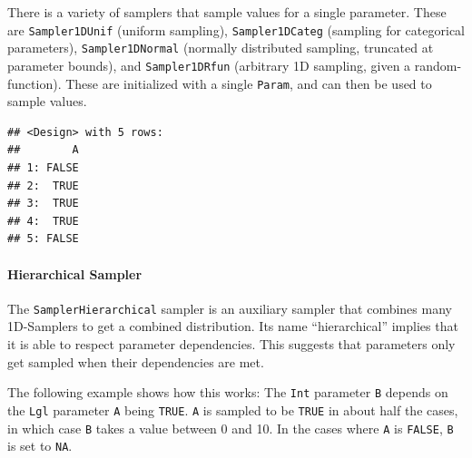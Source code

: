 \documentclass[]{scrbook}
\newenvironment{Shaded}{\begin{snugshade}}{\end{snugshade}}
\newcommand{\DecValTok}[1]{\textcolor[rgb]{0.00,0.00,0.81}{#1}}
\newcommand{\KeywordTok}[1]{\textcolor[rgb]{0.13,0.29,0.53}{\textbf{#1}}}
\newcommand{\NormalTok}[1]{#1}
\newcommand{\OperatorTok}[1]{\textcolor[rgb]{0.81,0.36,0.00}{\textbf{#1}}}
\newcommand{\StringTok}[1]{\textcolor[rgb]{0.31,0.60,0.02}{#1}}
\let\oldparagraph\paragraph
\renewcommand{\paragraph}[1]{\oldparagraph{#1}\mbox{}}
\renewenvironment{Shaded} {\begin{snugshade}\small} {\end{snugshade}}
\begin{document}
There is a variety of samplers that sample values for a single parameter.
These are \texttt{Sampler1DUnif} (uniform sampling), \texttt{Sampler1DCateg} (sampling for categorical parameters), \texttt{Sampler1DNormal} (normally distributed sampling, truncated at parameter bounds), and \texttt{Sampler1DRfun} (arbitrary 1D sampling, given a random-function).
These are initialized with a single \texttt{Param}, and can then be used to sample values.

\begin{Shaded}
\end{Shaded}

\begin{verbatim}
## <Design> with 5 rows:
##        A
## 1: FALSE
## 2:  TRUE
## 3:  TRUE
## 4:  TRUE
## 5: FALSE
\end{verbatim}

\hypertarget{hierarchical-sampler}{%
\paragraph{Hierarchical Sampler}\label{hierarchical-sampler}}

The \texttt{SamplerHierarchical} sampler is an auxiliary sampler that combines many 1D-Samplers to get a combined distribution.
Its name ``hierarchical'' implies that it is able to respect parameter dependencies.
This suggests that parameters only get sampled when their dependencies are met.

The following example shows how this works: The \texttt{Int} parameter \texttt{B} depends on the \texttt{Lgl} parameter \texttt{A} being \texttt{TRUE}.
\texttt{A} is sampled to be \texttt{TRUE} in about half the cases, in which case \texttt{B} takes a value between 0 and 10.
In the cases where \texttt{A} is \texttt{FALSE}, \texttt{B} is set to \texttt{NA}.
\end{document}
